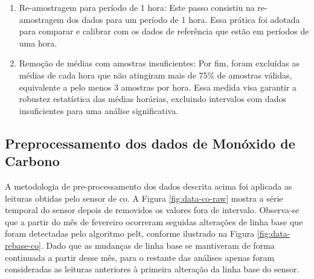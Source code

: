 \begin{enumerate}
    \item Re-amostragem para período de 1 hora: Este passo consistiu na re-amostragem dos dados para um período de 1 hora. Essa prática foi adotada para comparar e calibrar com os dados de referência que estão em períodos de uma hora.
    \item Remoção de médias com amostras insuficientes: Por fim, foram excluídas as médias de cada hora que não atingiram mais de 75\% de amostras válidas, equivalente a pelo menos 3 amostras por hora. Essa medida visa garantir a robustez estatística das médias horárias, excluindo intervalos com dados insuficientes para uma análise significativa.
\end{enumerate}

\subsection{Preprocessamento dos dados de Monóxido de Carbono}

A metodologia de pre-processamento dos dados descrita acima foi aplicada as leituras obtidas pelo sensor de \acrshort{co}. A Figura \ref{fig:data-co-raw} mostra a série temporal do sensor depois de removidos os valores fora de intervalo. Observa-se que a partir do mês de fevereiro ocorreram seguidas alterações de linha base que foram detectadas pelo algoritmo \acrshort{pelt}, conforme ilustrado na Figura \ref{fig:data-rebase-co}. Dado que as mudanças de linha base se mantiveram de forma continuada a partir desse mês, para o restante das análises apenas foram consideradas as leituras anteriores à primeira alteração da linha base do sensor.

